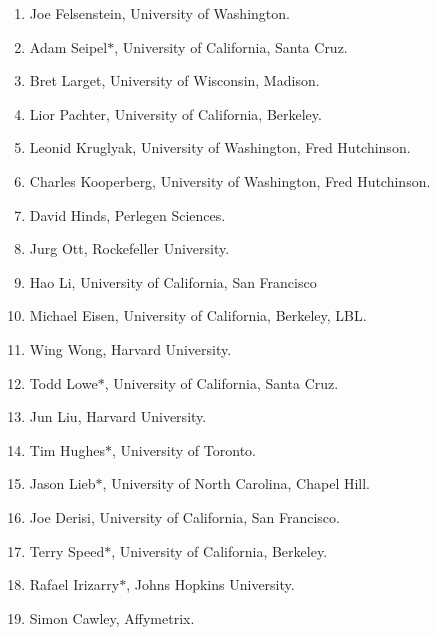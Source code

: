 \documentclass[12pt]{amsart}
\begin{document}
\begin{enumerate}

\item Joe Felsenstein, University of Washington.

\item Adam Seipel$\mathbf{*}$, University of California, Santa Cruz.

\item Bret Larget, University of Wisconsin, Madison.

\item Lior Pachter, University of California, Berkeley.

\item Leonid Kruglyak, University of Washington, Fred Hutchinson.

\item Charles Kooperberg, University of Washington, Fred
Hutchinson.

\item David Hinds, Perlegen Sciences.

\item Jurg Ott, Rockefeller University.

\item Hao Li, University of California, San Francisco

\item Michael Eisen, University of California, Berkeley, LBL.

\item Wing Wong, Harvard University.

\item Todd Lowe$\mathbf{*}$, University of California, Santa Cruz.

\item Jun Liu, Harvard University.

\item Tim Hughes$\mathbf{*}$, University of Toronto.

\item Jason Lieb$\mathbf{*}$, University of North Carolina, Chapel Hill.

\item Joe Derisi, University of California, San Francisco.

\item Terry Speed$\mathbf{*}$, University of California, Berkeley.

\item Rafael Irizarry$\mathbf{*}$, Johns Hopkins University.

\item Simon Cawley, Affymetrix.


\end{enumerate}
\end{document}
